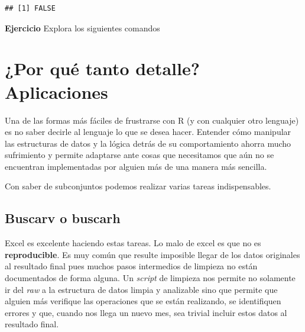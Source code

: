 \documentclass[]{article}
\newenvironment{Shaded}{\begin{snugshade}}{\end{snugshade}}
\newcommand{\KeywordTok}[1]{\textcolor[rgb]{0.13,0.29,0.53}{\textbf{{#1}}}}
\newcommand{\DecValTok}[1]{\textcolor[rgb]{0.00,0.00,0.81}{{#1}}}
\newcommand{\FloatTok}[1]{\textcolor[rgb]{0.00,0.00,0.81}{{#1}}}
\newcommand{\StringTok}[1]{\textcolor[rgb]{0.31,0.60,0.02}{{#1}}}
\newcommand{\NormalTok}[1]{{#1}}
\begin{document}
\begin{verbatim}
## [1] FALSE
\end{verbatim}

\textbf{Ejercicio} Explora los siguientes comandos

\begin{Shaded}
\end{Shaded}

\section{¿Por qué tanto detalle?
Aplicaciones}\label{por-que-tanto-detalle-aplicaciones}

Una de las formas más fáciles de frustrarse con R (y con cualquier otro
lenguaje) es no saber decirle al lenguaje lo que se desea hacer.
Entender cómo manipular las estructuras de datos y la lógica detrás de
su comportamiento ahorra mucho sufrimiento y permite adaptarse ante
cosas que necesitamos que aún no se encuentran implementadas por alguien
más de una manera más sencilla.

Con saber de subconjuntos podemos realizar varias tareas indispensables.

\subsection{Buscarv o buscarh}\label{buscarv-o-buscarh}

Excel es excelente haciendo estas tareas. Lo malo de excel es que no es
\textbf{reproducible}. Es muy común que resulte imposible llegar de los
datos originales al resultado final pues muchos pasos intermedios de
limpieza no están documentados de forma alguna. Un \emph{script} de
limpieza nos permite no solamente ir del \emph{raw} a la estructura de
datos limpia y analizable sino que permite que alguien más verifique las
operaciones que se están realizando, se identifiquen errores y que,
cuando nos llega un nuevo mes, sea trivial incluir estos datos al
resultado final.
\end{document}
